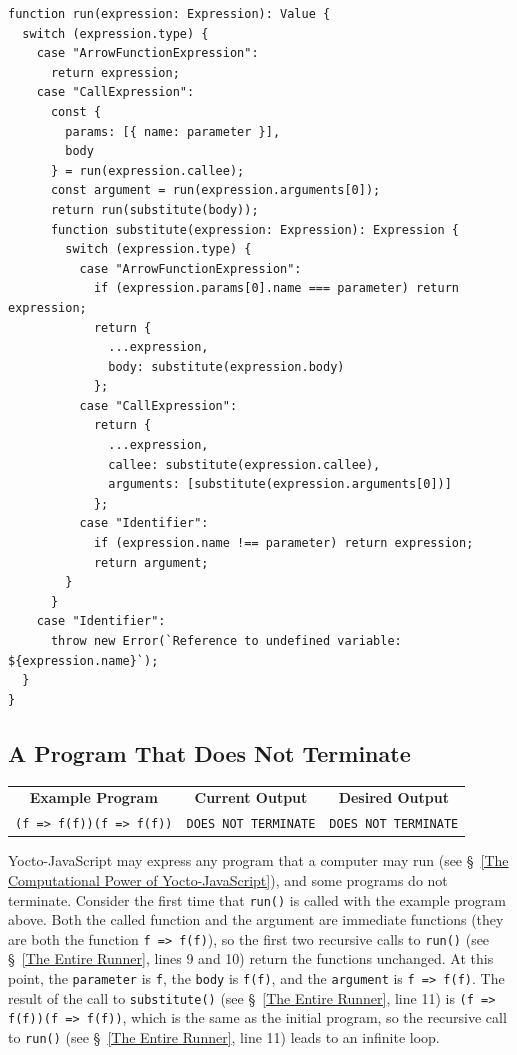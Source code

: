 \documentclass[12pt, oneside]{book}
\begin{document}
\begin{verbatim}
function run(expression: Expression): Value {
  switch (expression.type) {
    case "ArrowFunctionExpression":
      return expression;
    case "CallExpression":
      const {
        params: [{ name: parameter }],
        body
      } = run(expression.callee);
      const argument = run(expression.arguments[0]);
      return run(substitute(body));
      function substitute(expression: Expression): Expression {
        switch (expression.type) {
          case "ArrowFunctionExpression":
            if (expression.params[0].name === parameter) return expression;
            return {
              ...expression,
              body: substitute(expression.body)
            };
          case "CallExpression":
            return {
              ...expression,
              callee: substitute(expression.callee),
              arguments: [substitute(expression.arguments[0])]
            };
          case "Identifier":
            if (expression.name !== parameter) return expression;
            return argument;
        }
      }
    case "Identifier":
      throw new Error(`Reference to undefined variable: ${expression.name}`);
  }
}
\end{verbatim}

\subsection{A Program That Does Not Terminate}

\begin{center}
\begin{tabular}{c|c|c}
\textbf{Example Program} & \textbf{Current Output} & \textbf{Desired Output} \\
\texttt{(f => f(f))(f => f(f))} & \texttt{DOES NOT TERMINATE} & \texttt{DOES NOT TERMINATE} \\
\end{tabular}
\end{center}

Yocto-JavaScript may express any program that a computer may run (see §~\ref{The Computational Power of Yocto-JavaScript}), and some programs do not terminate. Consider the first time that \texttt{run()} is called with the example program above. Both the called function and the argument are immediate functions (they are both the function \texttt{f => f(f)}), so the first two recursive calls to \texttt{run()} (see §~\ref{The Entire Runner}, lines 9 and 10) return the functions unchanged. At this point, the \texttt{parameter} is \texttt{f}, the \texttt{body} is \texttt{f(f)}, and the \texttt{argument} is \texttt{f => f(f)}. The result of the call to \texttt{substitute()} (see §~\ref{The Entire Runner}, line 11) is \texttt{(f => f(f))(f => f(f))}, which is the same as the initial program, so the recursive call to \texttt{run()} (see §~\ref{The Entire Runner}, line 11) leads to an infinite loop.
\end{document}
